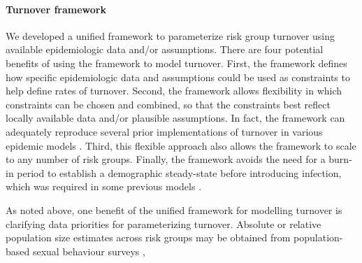 \paragraph{Turnover framework}
We developed a unified framework
to parameterize risk group turnover
using available epidemiologic data and/or assumptions.
There are four potential benefits of using the framework to model turnover.
First, the framework defines how specific epidemiologic data and assumptions
could be used as constraints to help define rates of turnover.
Second, the framework allows flexibility in which constraints can be chosen and combined,
so that the constraints best reflect locally available data and/or plausible assumptions.
In fact, the framework can adequately reproduce
several prior implementations of turnover
in various epidemic models \citep{Stigum1994,Eaton2014,Henry2015}.
Third, this flexible approach also allows the framework to scale
to any number of risk groups.
Finally, the framework avoids the need for a burn-in period
to establish a demographic steady-state before introducing infection,
which was required in some previous models \citep{Boily2015}.
\par
As noted above, one benefit of the unified framework for modelling turnover
is clarifying data priorities for parameterizing turnover.
Absolute or relative population size estimates across risk groups
may be obtained from population-based sexual behaviour surveys \citep{DHS},
